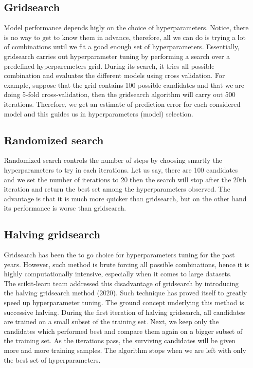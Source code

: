 \subsection{Gridsearch}
Model performance depends higly on the choice of hyperparameters. Notice, there is no way to get to know them in advance, therefore, all we can do is trying a lot of combinations until we fit a good enough set of hyperparameters. Essentially, gridsearch carries out hyperparameter tuning by performing a search over a predefined hyperparemeters grid. During its search, it tries all possible combination and evaluates the different models %
using cross validation. For example, suppose that the grid contains 100 possible candidates and that we are doing 5-fold cross-validation, then the gridsearch algorithm will carry out 500 iterations.
Therefore, we get an estimate of prediction error for each considered model and this guides us in hyperparameters (model) selection.

\subsection{Randomized search}
Randomized search controls the number of steps by choosing smartly the hyperparameters to try in each iterations.
Let us say, there are 100 candidates and we set the number of iterations to 20 then the search will stop after the 20th iteration and return the best set among the hyperparameters observed.
The advantage is that it is much more quicker than gridsearch, but on the other hand its performance is worse than gridsearch.

\subsection{Halving gridsearch}
Gridsearch has been the to go choice for hyperparameters tuning for the past years. However, such method is brute forcing all possible combinations, hence it is highly computationally intensive, especially when it comes to large datasets.
\\
The scikit-learn team addressed this disadvantage of gridsearch by introducing the halving gridsearch method \cite{scikithalvinggridsearch} (2020). Such technique has proved itself to greatly speed up hyperparameter tuning.
The ground concept underlying this method is successive halving. During the first iteration of halving gridsearch, all candidates are trained on a small subset of the training set. Next, we keep only the candidates which performed best and compare  them again on a bigger subset of the training set. As the iterations pass, the surviving candidates will be given more and more training samples. The algorithm stops when we are left with only the best set of hyperparameters.

